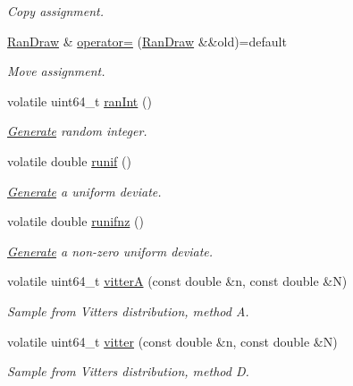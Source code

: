 \begin{DoxyCompactItemize}
\begin{DoxyCompactList}\small\item\em Copy assignment. \end{DoxyCompactList}\item 
\hyperlink{classsamp_files_1_1_ran_draw}{Ran\+Draw} \& \hyperlink{classsamp_files_1_1_ran_draw_a00ab2134a1acce5352195c085744b1bf}{operator=} (\hyperlink{classsamp_files_1_1_ran_draw}{Ran\+Draw} \&\&old)=default
\begin{DoxyCompactList}\small\item\em Move assignment. \end{DoxyCompactList}\item 
volatile uint64\+\_\+t \hyperlink{classsamp_files_1_1_ran_draw_adaa98fd478582702700f4c86884c0966}{ran\+Int} ()
\begin{DoxyCompactList}\small\item\em \hyperlink{classsamp_files_1_1_generate}{Generate} random integer. \end{DoxyCompactList}\item 
volatile double \hyperlink{classsamp_files_1_1_ran_draw_ae5224ecc69d0c12d37ab0b5a81049618}{runif} ()
\begin{DoxyCompactList}\small\item\em \hyperlink{classsamp_files_1_1_generate}{Generate} a uniform deviate. \end{DoxyCompactList}\item 
volatile double \hyperlink{classsamp_files_1_1_ran_draw_a5688bd202e487435398b1c1cb6f9ce30}{runifnz} ()
\begin{DoxyCompactList}\small\item\em \hyperlink{classsamp_files_1_1_generate}{Generate} a non-\/zero uniform deviate. \end{DoxyCompactList}\item 
volatile uint64\+\_\+t \hyperlink{classsamp_files_1_1_ran_draw_a6319a7eac88ba9b4b54f67649121e3a7}{vitterA} (const double \&n, const double \&N)
\begin{DoxyCompactList}\small\item\em Sample from Vitter\textquotesingle{}s distribution, method A. \end{DoxyCompactList}\item 
volatile uint64\+\_\+t \hyperlink{classsamp_files_1_1_ran_draw_a2dcd2540f148c4fa271156a46640f701}{vitter} (const double \&n, const double \&N)
\begin{DoxyCompactList}\small\item\em Sample from Vitter\textquotesingle{}s distribution, method D. \end{DoxyCompactList}\end{DoxyCompactItemize}


